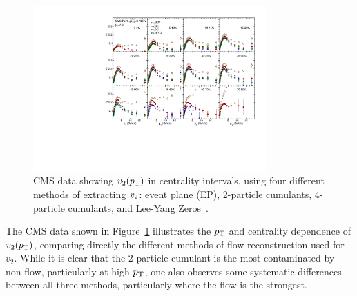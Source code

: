 \begin{figure}[!tb]
\begin{center}
\includegraphics[width=0.8\textwidth]{flowcorrelations_figs/v2_pt_12cen_4methods.pdf}
\caption[]{
CMS data showing $\mbox{$v_2$}(\mbox{$p_{\mathrm{T}}$})$ in centrality intervals, using four different methods of extracting
$\mbox{$v_2$}$: event plane (EP), 2-particle cumulants, 4-particle cumulants, and Lee-Yang Zeros~\cite{Chatrchyan:2012ta}.
}
\label{fig:pas:fc:methods}
\end{center}
\end{figure}

The CMS data shown in Figure~\ref{fig:pas:fc:methods} illustrates the $\mbox{$p_{\mathrm{T}}$}$ and centrality dependence of
$v_2(\mbox{$p_{\mathrm{T}}$})$, comparing directly the different methods of flow reconstruction used for $v_2$.  
While it is clear that the 2-particle cumulant is the most contaminated by non-flow, particularly at high $\mbox{$p_{\mathrm{T}}$}$,
one also observes some systematic differences between all three methods, particularly where the flow
is the strongest.

